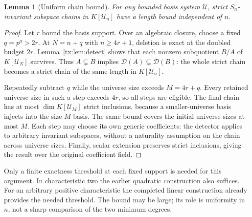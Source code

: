 \documentclass[11pt,a4paper,oneside,openany]{book}
\newtheorem{lemma}[theorem]{Lemma}
\theoremstyle{definition}\newtheorem{definition}[theorem]{Definition}
\theoremstyle{remark}\newtheorem{remark}[theorem]{Remark}
\numberwithin{equation}{chapter}
\begin{document}
\begin{lemma}[Uniform chain bound]\label{tx:lem:chains}
For any bounded basis system $\mathcal U$, strict $S_n$-invariant
subspace chains in $K[\mathcal U_n]$ have a length bound independent of $n$.
\end{lemma}
\begin{proof}
Let $r$ bound the basis support. Over an algebraic closure, choose a
fixed $q=p^a>2r$. At $N=n+q$ with $n\ge4r+1$, deletion is exact at the
doubled budget $2r$. Lemma~\ref{tx:lem:detect} shows that each nonzero
subquotient $B/A$ of $K[\mathcal U_N]$ survives. Thus
$A\subsetneq B$ implies
$\mathcal D(A)\subsetneq\mathcal D(B)$: the whole strict chain becomes
a strict chain of the same length in $K[\mathcal U_n]$.

Repeatedly subtract $q$ while the universe size exceeds $M=4r+q$. Every retained
universe size in such a step exceeds $4r$, so all steps are eligible. The final
chain has at most $\dim K[\mathcal U_M]$ strict inclusions, because a
smaller-universe basis injects into the size-$M$ basis. The same bound covers
the initial universe sizes at most $M$. Each step may choose its own generic
coefficients: the detector applies to arbitrary invariant subspaces,
without a naturality assumption on the chain across universe sizes. Finally,
scalar extension preserves strict inclusions, giving the result over
the original coefficient field.
\end{proof}

Only a finite exactness threshold at each fixed support is needed for
this argument. In characteristic two the earlier quadratic construction also suffices.
For an arbitrary positive characteristic the completed linear construction
already provides the needed threshold. The
bound may be large; its role is uniformity in $n$, not a sharp comparison
of the two minimum degrees.
\end{document}
